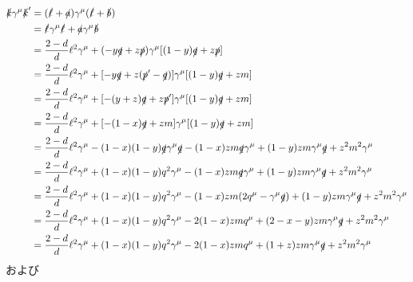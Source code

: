 \begin{align*}
  \slashed{k} \gamma^\mu \slashed{k}' &= (\slashed\ell + \slashed{a}) \gamma^\mu (\slashed\ell + \slashed{b}) \\
  &= \slashed\ell \gamma^\mu \slashed\ell + \slashed{a} \gamma^\mu \slashed{b} \\
  &= \frac{2-d}{d} \ell^2 \gamma^\mu + (-y\slashed{q} + z\slashed{p}) \gamma^\mu [(1-y)\slashed{q} + z\slashed{p}] \\
  &= \frac{2-d}{d} \ell^2 \gamma^\mu + [-y\slashed{q} + z(\slashed{p}' - \slashed{q})] \gamma^\mu [(1-y)\slashed{q} + zm] \\
  &= \frac{2-d}{d} \ell^2 \gamma^\mu + [-(y+z)\slashed{q} + z\slashed{p}'] \gamma^\mu [(1-y)\slashed{q} + zm] \\
  &= \frac{2-d}{d} \ell^2 \gamma^\mu + [-(1-x)\slashed{q} + zm] \gamma^\mu [(1-y)\slashed{q} + zm] \\
  &= \frac{2-d}{d} \ell^2 \gamma^\mu - (1-x)(1-y) \slashed{q} \gamma^\mu \slashed{q}
  - (1-x)z m \slashed{q} \gamma^\mu + (1-y)z m \gamma^\mu \slashed{q} + z^2m^2 \gamma^\mu \\
  &= \frac{2-d}{d} \ell^2 \gamma^\mu + (1-x)(1-y) q^2 \gamma^\mu
  - (1-x)z m \slashed{q} \gamma^\mu + (1-y)z m \gamma^\mu \slashed{q} + z^2m^2 \gamma^\mu \\
  &= \frac{2-d}{d} \ell^2 \gamma^\mu + (1-x)(1-y) q^2 \gamma^\mu
  - (1-x)z m (2q^\mu - \gamma^\mu \slashed{q}) + (1-y)z m \gamma^\mu \slashed{q} + z^2m^2 \gamma^\mu \\
  &= \frac{2-d}{d} \ell^2 \gamma^\mu + (1-x)(1-y) q^2 \gamma^\mu
  - 2 (1-x)z m q^\mu + (2-x-y)z m \gamma^\mu \slashed{q} + z^2m^2 \gamma^\mu \\
  &= \frac{2-d}{d} \ell^2 \gamma^\mu + (1-x)(1-y) q^2 \gamma^\mu
  - 2 (1-x)z m q^\mu + (1+z)z m \gamma^\mu \slashed{q} + z^2m^2 \gamma^\mu
\end{align*}
および

